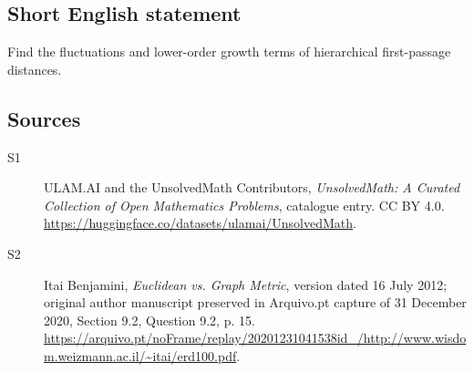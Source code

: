\documentclass[11pt]{article}
\begin{document}
\subsection{Short English statement}
Find the fluctuations and lower-order growth terms of hierarchical first-passage distances.
\subsection{Sources}
\begin{description}
\item[\hypertarget{source:statement:1}{S1}] ULAM.AI and the UnsolvedMath Contributors, \emph{UnsolvedMath: A Curated Collection of Open Mathematics Problems}, catalogue entry. CC BY 4.0. \url{https://huggingface.co/datasets/ulamai/UnsolvedMath}.
\item[\hypertarget{source:statement:2}{S2}] Itai Benjamini, \emph{Euclidean vs. Graph Metric}, version dated 16 July 2012; original author manuscript preserved in Arquivo.pt capture of 31 December 2020, Section 9.2, Question 9.2, p. 15. \url{https://arquivo.pt/noFrame/replay/20201231041538id_/http://www.wisdom.weizmann.ac.il/~itai/erd100.pdf}.
\end{description}
\label{end:statement}
\end{document}
